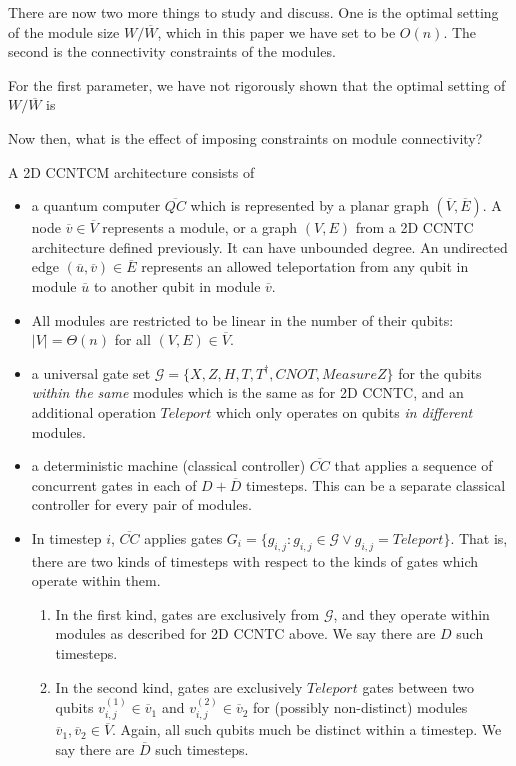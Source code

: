 There are now two more things to study and discuss. One is the optimal setting
of the module size $W/\overline{W}$, which in this paper we have set to
be $O(n)$. The second is the connectivity constraints of the modules.

For the first parameter, we have not rigorously shown that the optimal setting
of $W / \overline{W}$ is 

Now then, what is the effect of imposing constraints on module connectivity?



\begin{definition}
A \textsf{2D CCNTCM} architecture consists of

\begin{itemize}
\item a quantum computer $\overline{QC}$ which is represented by a planar graph $(\overline{V},\overline{E})$. A
node $\overline{v} \in \overline{V}$ represents a module, or a graph $(V,E)$
from a \textsf{2D CCNTC} architecture defined previously. It can have
unbounded degree.
An
undirected edge $(\overline{u},\overline{v}) \in \overline{E}$ represents an
allowed teleportation from any qubit in module $\overline{u}$ to
another qubit in module $\overline{v}$.
\item All modules are restricted to be linear in the number of their qubits:
$|V| = \Theta(n)$ for all $(V,E) \in \overline{V}$.
\item a universal gate set $\mathcal{G} = \{X, Z, H, T, T^{\dagger}, CNOT,
MeasureZ\}$
for the qubits \emph{within the same} modules which is the same as for \textsf{2D CCNTC},
and an additional operation $Teleport$ which only operates on qubits
\emph{in
different} modules.
\item a deterministic machine (classical controller) $\overline{CC}$ that applies a sequence
of concurrent gates in each of $D+\overline{D}$ timesteps.
This can be a separate classical controller
for every pair of modules.
\item In timestep $i$, $\overline{CC}$ applies
gates $G_i = \{g_{i,j} : g_{i,j} \in \mathcal{G} \lor g_{i,j} = Teleport \}$.
That is, there are two kinds of timesteps with respect to the kinds of gates
which operate within them.
\begin{enumerate}
\item In the first kind, gates are exclusively from $\mathcal{G}$, and
they operate within modules as described
for \textsf{2D CCNTC} above. We say there are $D$ such timesteps.
\item In the second kind, gates are exclusively $Teleport$ gates between two qubits $v^{(1)}_{i,j} \in \overline{v}_1$ and
$v^{(2)}_{i,j} \in \overline{v}_2$ for
(possibly non-distinct) modules $\overline{v}_1, \overline{v}_2 \in \overline{V}$.
Again, all such qubits much be distinct within a timestep.
We say there are $\overline{D}$ such timesteps.
\end{enumerate}


\end{itemize}
\end{definition}
